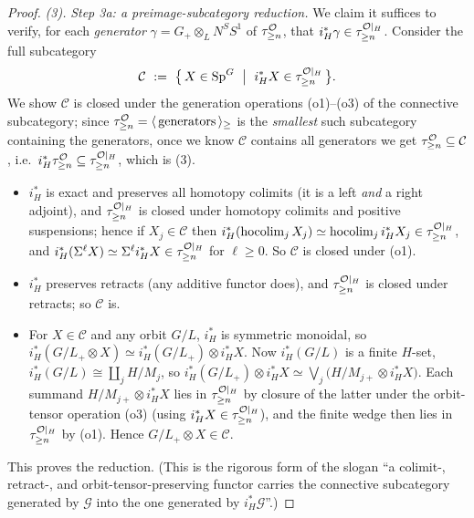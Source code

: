 \begin{proof}
\emph{(3).}
\emph{Step 3a: a preimage-subcategory reduction.} We claim it suffices to verify,
for each \emph{generator} $\gamma=G_+\otimes_L N^S S^1$ of $\tau^{\mathcal{O}}_{\ge n}$,
that $i_H^\ast\gamma\in\tau^{\mathcal{O}|_H}_{\ge n}$. Consider the full subcategory
\[
\mathcal C\ :=\ \bigl\{\,X\in\qfiveSp^G\ \bigm|\ i_H^\ast X\in\tau^{\qfiveaO|_H}_{\ge n}\,\bigr\}.
\]
We show $\mathcal C$ is closed under the generation operations (o1)--(o3) of the
connective subcategory; since $\tau^{\mathcal{O}}_{\ge n}=\langle\,\text{generators}\,\rangle_{\ge}$
is the \emph{smallest} such subcategory containing the generators, once we know
$\mathcal C$ contains all generators we get $\tau^{\mathcal{O}}_{\ge n}\subseteq\mathcal C$,
i.e.\ $i_H^\ast\tau^{\mathcal{O}}_{\ge n}\subseteq\tau^{\mathcal{O}|_H}_{\ge n}$, which is (3).
\begin{itemize}\setlength\itemsep{2pt}
\item[(o1)] $i_H^\ast$ is exact and preserves all homotopy colimits (it is a left
\emph{and} a right adjoint), and $\tau^{\mathcal{O}|_H}_{\ge n}$ is closed under
homotopy colimits and positive suspensions; hence if $X_j\in\mathcal C$ then
$i_H^\ast(\operatorname{hocolim}_j X_j)\simeq\operatorname{hocolim}_j i_H^\ast X_j
\in\tau^{\mathcal{O}|_H}_{\ge n}$, and $i_H^\ast(\Sigma^{\ell}X)\simeq\Sigma^{\ell}i_H^\ast X
\in\tau^{\mathcal{O}|_H}_{\ge n}$ for $\ell\ge0$. So $\mathcal C$ is closed under (o1).
\item[(o2)] $i_H^\ast$ preserves retracts (any additive functor does), and
$\tau^{\mathcal{O}|_H}_{\ge n}$ is closed under retracts; so $\mathcal C$ is.
\item[(o3)] For $X\in\mathcal C$ and any orbit $G/L$, $i_H^\ast$ is symmetric
monoidal, so $i_H^\ast(G/L_+\otimes X)\simeq i_H^\ast(G/L_+)\otimes i_H^\ast X$.
Now $i_H^\ast(G/L)$ is a finite $H$-set, $i_H^\ast(G/L)\cong\coprod_j H/M_j$, so
$i_H^\ast(G/L_+)\otimes i_H^\ast X\simeq\bigvee_j\bigl(H/M_{j+}\otimes i_H^\ast X\bigr)$.
Each summand $H/M_{j+}\otimes i_H^\ast X$ lies in $\tau^{\mathcal{O}|_H}_{\ge n}$ by
closure of the latter under the orbit-tensor operation (o3) (using
$i_H^\ast X\in\tau^{\mathcal{O}|_H}_{\ge n}$), and the finite wedge then lies in
$\tau^{\mathcal{O}|_H}_{\ge n}$ by (o1). Hence $G/L_+\otimes X\in\mathcal C$.
\end{itemize}
This proves the reduction. (This is the rigorous form of the slogan ``a
colimit-, retract-, and orbit-tensor-preserving functor carries the connective
subcategory generated by $\mathcal G$ into the one generated by $i_H^\ast\mathcal
G$''.)


\end{proof}
